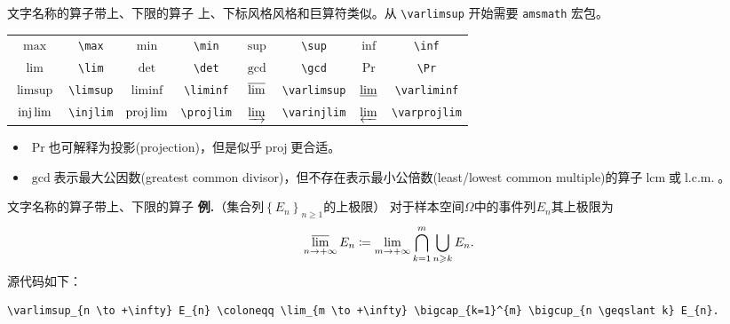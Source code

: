\documentclass[mathserif]{beamer}
\newcommand{\codegreen}[1]{\textcolor{codegreen}{#1}}
\newenvironment{instance}{\zihao{-5}\textbf{\songti \codegreen{例.}}}{\hfill\par}
\begin{document}
\begin{frame}[fragile]{文字名称的算子}{带上、下限的算子}
上、下标风格风格和巨算符类似。从 \lstinline'\varlimsup' 开始需要 \verb'amsmath' 宏包。

\begin{table}[H]
\centering
\begin{tabular}{cc|cc|cc|cc}
	\toprule
	$\max$ & \lstinline'\max' & $\min$ & \lstinline'\min' & $\sup$ & \lstinline'\sup' & $\inf$ & \lstinline'\inf' \\
	$\lim$ & \lstinline'\lim' & $\det$ & \lstinline'\det' & $\gcd$ & \lstinline'\gcd' & $\Pr$ & \lstinline'\Pr' \\
	$\limsup$ & \lstinline'\limsup' & $\liminf$ & \lstinline'\liminf' & $\varlimsup$ & \lstinline'\varlimsup' & $\varliminf$ & \lstinline'\varliminf' \\
	$\injlim$ & \lstinline'\injlim' & $\projlim$ & \lstinline'\projlim' & $\varinjlim$ & \lstinline'\varinjlim' & $\varprojlim$ & \lstinline'\varprojlim' \\
	\bottomrule
\end{tabular}
\end{table}
\begin{itemize}

\item $\Pr$也可解释为投影(projection)，但是似乎$\operatorname{proj}$更合适。

\item $\gcd$表示最大公因数(greatest common divisor)，但不存在表示最小公倍数(least/lowest common multiple)的算子$\operatorname{lcm}$或$\operatorname{l.c.m.}$。

\end{itemize}
\end{frame}

\begin{frame}[fragile]{文字名称的算子}{带上、下限的算子}
\begin{instance}（集合列$\left\{ E_{n} \right\}_{n \geqslant 1}$的上极限）
对于样本空间$\varOmega$中的事件列$E_{n}$其上极限为
\begin{equation*}\label{eq:limsup}
	\varlimsup_{n \to +\infty} E_{n} \coloneqq \lim_{m \to +\infty} \bigcap_{k=1}^{m} \bigcup_{n \geqslant k} E_{n}.
\end{equation*}
源代码如下：
\begin{lstlisting}[numbers=none]
\varlimsup_{n \to +\infty} E_{n} \coloneqq \lim_{m \to +\infty} \bigcap_{k=1}^{m} \bigcup_{n \geqslant k} E_{n}.
\end{lstlisting}
\end{instance}
\end{frame}
\end{document}
